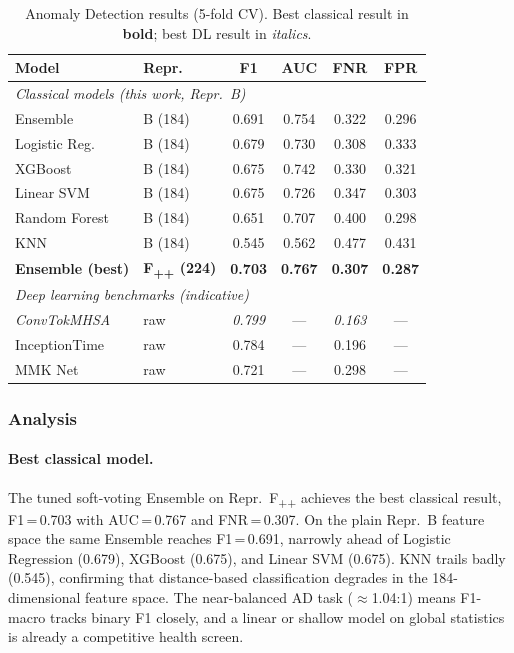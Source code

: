 \begin{table}[H]
    \centering
    \caption{Anomaly Detection results (5-fold CV). Best classical result in
             \textbf{bold}; best DL result in \textit{italics}.}
    \label{tab:ad_results}
    \begin{tabular}{llcccc}
        \toprule
        \textbf{Model} & \textbf{Repr.} & \textbf{F1} & \textbf{AUC} & \textbf{FNR} & \textbf{FPR} \\
        \midrule
        \multicolumn{6}{l}{\textit{Classical models (this work, Repr.~B)}} \\
        Ensemble       & B (184) & 0.691 & 0.754 & 0.322 & 0.296 \\
        Logistic Reg.  & B (184) & 0.679 & 0.730 & 0.308 & 0.333 \\
        XGBoost        & B (184) & 0.675 & 0.742 & 0.330 & 0.321 \\
        Linear SVM     & B (184) & 0.675 & 0.726 & 0.347 & 0.303 \\
        Random Forest  & B (184) & 0.651 & 0.707 & 0.400 & 0.298 \\
        KNN            & B (184) & 0.545 & 0.562 & 0.477 & 0.431 \\
        \midrule
        \textbf{Ensemble (best)} & \textbf{F\textsubscript{++} (224)} & \textbf{0.703} & \textbf{0.767} & \textbf{0.307} & \textbf{0.287} \\
        \midrule
        \multicolumn{6}{l}{\textit{Deep learning benchmarks (indicative) \cite{lmsd2025}}} \\
        \textit{ConvTokMHSA}  & raw & \textit{0.799} & --- & \textit{0.163} & --- \\
        InceptionTime \cite{inceptiontime2020} & raw & 0.784 & --- & 0.196 & --- \\
        MMK Net        & raw & 0.721 & --- & 0.298 & --- \\
        \bottomrule
    \end{tabular}
\end{table}

\subsubsection{Analysis}

\paragraph{Best classical model.}
The tuned soft-voting Ensemble on Repr.~F\textsubscript{++} achieves the best
classical result, F1\,=\,0.703 with AUC\,=\,0.767 and FNR\,=\,0.307. On the
plain Repr.~B feature space the same Ensemble reaches F1\,=\,0.691, narrowly
ahead of Logistic Regression (0.679), XGBoost (0.675), and Linear SVM (0.675).
KNN trails badly (0.545), confirming that distance-based classification degrades
in the 184-dimensional feature space. The near-balanced AD task ($\approx$1.04:1)
means F1-macro tracks binary F1 closely, and a linear or shallow model on global
statistics is already a competitive health screen.


